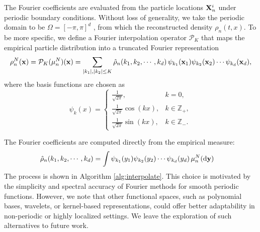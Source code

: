 \documentclass[a4paper,fleqn]{cas-sc}
\theoremstyle{definition}
\theoremstyle{remark}
\begin{document}
The Fourier coefficients are evaluated from the particle locations $\mathbf{X}^i_n$ under periodic boundary conditions. Without loss of generality, we take the periodic domain to be $\Omega=[-\pi,\pi]^d$ , from which the reconstructed density $\rho_n(t,x)$. To be more specific, we define a Fourier interpolation operator $\mathcal P_K$
that maps the empirical particle distribution into a truncated Fourier representation 
\[
\rho^N_n(\mathbf{x}) = \mathcal{P}_K(\mu^N_n)(\mathbf{x}) 
          = \sum_{\vert k_1\vert ,\vert k_2\vert \leq K} \hat{\rho}_n(k_1,k_2,\cdots,k_d)\,\psi_{k_1}(\mathbf{x}_1)\psi_{k_2}(\mathbf{x}_2)\cdots\psi_{k_d}(\mathbf{x}_d),
\]
where the basis functions are chosen as
\[
\psi_k(x) =
\begin{cases}
\frac{1}{\sqrt{2\pi}}, & k=0, \\
\frac{1}{\sqrt{2\pi}} \cos(k  x), & k \in \mathbb{Z}_+, \\
\frac{1}{\sqrt{2\pi}}\sin(k  x), & k \in \mathbb{Z}_- .
\end{cases}
\]

The Fourier coefficients are computed directly from the empirical measure:
\begin{equation}
\begin{aligned}
    \hat{\rho}_n(k_1,k_2,\cdots,k_d) &= \int \psi_{k_1}(y_1)\psi_{k_2}(y_2)\cdots \psi_{k_d}(y_d)\,\mu^N_n(\mathrm{d}\mathbf{y})
\end{aligned}
\label{eq:Fourier_mode}
\end{equation}
The process is shown in Algorithm \ref{alg:interpolate}. 
This choice is motivated by the simplicity and spectral accuracy of Fourier methods for smooth periodic functions. However, we note that other functional spaces, such as polynomial bases, wavelets, or kernel-based representations, could offer better adaptability in non-periodic or highly localized settings. We leave the exploration of such alternatives to future work.
\end{document}
